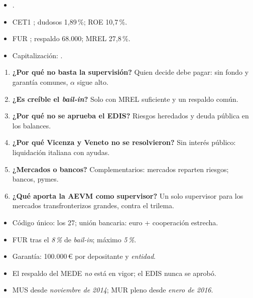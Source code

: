 \documentclass{article}
\begin{document}
\begin{columnas}
\anexorepaso
{}
\begin{itemize}
\item {}.
\item CET1 ; dudosos 1,89\,\%; ROE 10,7\,\%.
\item FUR ; respaldo 68.000; MREL 27,8\,\%.
\item Capitalización: .
\end{itemize}
\begin{enumerate}
\item \textbf{¿Por qué no basta la supervisión?} Quien decide debe pagar: sin fondo y garantía comunes, $\alpha$ sigue alto.
\item \textbf{¿Es creíble el \emph{bail-in}?} Solo con MREL suficiente y un respaldo común.
\item \textbf{¿Por qué no se aprueba el EDIS?} Riesgos heredados y deuda pública en los balances.
\item \textbf{¿Por qué Vicenza y Veneto no se resolvieron?} Sin interés público: liquidación italiana con ayudas.
\item \textbf{¿Mercados o bancos?} Complementarios: mercados reparten riesgos; bancos, pymes.
\item \textbf{¿Qué aporta la AEVM como supervisor?} Un solo supervisor para los mercados transfronterizos grandes, contra el trilema.
\end{enumerate}
\begin{trampa}
\begin{itemize}
\item Código único: los 27; unión bancaria: euro + cooperación estrecha.
\item FUR tras el \emph{8\,\%} de \emph{bail-in}; máximo \emph{5\,\%}.
\item Garantía: 100.000\,€ por depositante y \emph{entidad}.
\item El respaldo del MEDE \emph{no} está en vigor; el EDIS nunca se aprobó.
\item MUS desde \emph{noviembre de 2014}; MUR pleno desde \emph{enero de 2016}.
\end{itemize}
\end{trampa}

\end{columnas}
\end{document}
